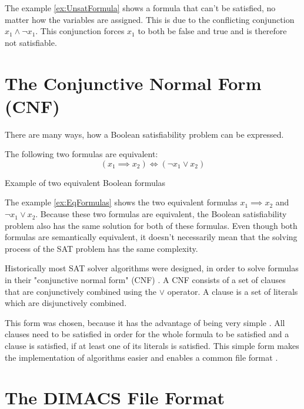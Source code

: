 The example \ref{ex:UnsatFormula} shows a formula that can't be satisfied, no matter how the variables are assigned. This is due to the conflicting conjunction $x_1 \wedge \neg x_1$. This conjunction forces $x_1$ to both be false and true and is therefore not satisfiable.

\section{The Conjunctive Normal Form (CNF)}

There are many ways, how a Boolean satisfiability problem can be expressed.

\begin{example}
\begin{leftbar}
The following two formulas are equivalent:
\begin{displaymath}
(x_1 \implies x_2) \iff (\neg x_1 \vee x_2)
\end{displaymath}
\end{leftbar}
\caption{Example of two equivalent Boolean formulas}
\label{ex:EqFormulas}
\end{example}

The example \ref{ex:EqFormulas} shows the two equivalent formulas $x_1 \implies x_2$ and $\neg x_1 \vee x_2$. Because these two formulas are equivalent, the Boolean satisfiability problem also has the same solution for both of these formulas. Even though both formulas are semantically equivalent, it doesn't necessarily mean that the solving process of the SAT problem has the same complexity.

Historically most SAT solver algorithms were designed, in order to solve formulas in their "conjunctive normal form" (CNF) \cite{biere2009handbook}. A CNF consists of a set of clauses that are conjunctively combined using the $\vee$ operator. A clause is a set of literals which are disjunctively combined. \cite{biere2009handbook}

This form was chosen, because it has the advantage of being very simple \cite{biere2009handbook}. All clauses need to be satisfied in order for the whole formula to be satisfied and a clause is satisfied, if at least one of its literals is satisfied. This simple form makes the implementation of algorithms easier and enables a common file format \cite{biere2009handbook}.

\section{The DIMACS File Format}

